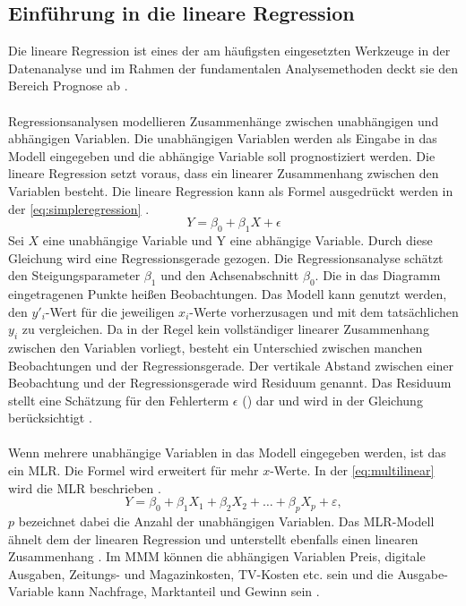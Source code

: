 \subsection{Einführung in die lineare Regression}
\label{einfuehrungInDieRegression}
Die lineare Regression ist eines der am häufigsten eingesetzten Werkzeuge in der Datenanalyse und im Rahmen der fundamentalen Analysemethoden deckt sie den Bereich Prognose ab \cite{frick2021data}.  \\\\
Regressionsanalysen modellieren Zusammenhänge zwischen unabhängigen und abhängigen Variablen. Die unabhängigen Variablen werden als Eingabe in das Modell eingegeben und die abhängige Variable soll prognostiziert werden. Die lineare Regression setzt voraus, dass ein linearer Zusammenhang zwischen den Variablen besteht. Die lineare Regression kann als Formel ausgedrückt werden in der \autoref{eq:simpleregression} \cite{frick2021data}. 
\begin{equation}
Y = \beta_0 + \beta_1 X + \epsilon \tag{3.1}
\label{eq:simpleregression}
\end{equation}
Sei \(X\) eine unabhängige Variable und Y eine abhängige Variable. Durch diese Gleichung wird eine Regressionsgerade gezogen. Die Regressionsanalyse schätzt den Steigungsparameter $\beta_1$ und den Achsenabschnitt $\beta_0$. Die in das Diagramm eingetragenen Punkte heißen Beobachtungen. Das Modell kann genutzt werden, den \(y'_i\)-Wert für die jeweiligen \(x_i\)-Werte vorherzusagen und mit dem tatsächlichen \(y_i\) zu vergleichen. Da in der Regel kein vollständiger linearer Zusammenhang zwischen den Variablen vorliegt, besteht ein Unterschied zwischen manchen Beobachtungen und der Regressionsgerade. Der vertikale Abstand zwischen einer Beobachtung und der Regressionsgerade wird Residuum genannt. Das Residuum stellt eine Schätzung für den Fehlerterm $\epsilon$ () dar und wird in der Gleichung berücksichtigt \cite{frick2021data}.  \\\\
Wenn mehrere unabhängige Variablen in das Modell eingegeben werden, ist das ein \ac{MLR}. Die Formel wird erweitert für mehr \(x\)-Werte. In der \autoref{eq:multilinear} wird die \ac{MLR} beschrieben \cite{frick2021data}. 
\begin{equation}
Y = \beta_0 + \beta_1 X_{1} + \beta_2 X_{2} + \dots + \beta_p X_{p} + \varepsilon, \tag{3.2}
\label{eq:multilinear}
\end{equation}
\(p\) bezeichnet dabei die Anzahl der unabhängigen Variablen. Das \ac{MLR}-Modell ähnelt dem der linearen Regression und unterstellt ebenfalls einen linearen Zusammenhang \cite{frick2021data}. Im \ac{MMM} können die abhängigen Variablen Preis, digitale Ausgaben, Zeitungs- und Magazinkosten, TV-Kosten etc. sein und die Ausgabe-Variable kann Nachfrage, Marktanteil und Gewinn sein \cite{akinkunmi2018data}.
